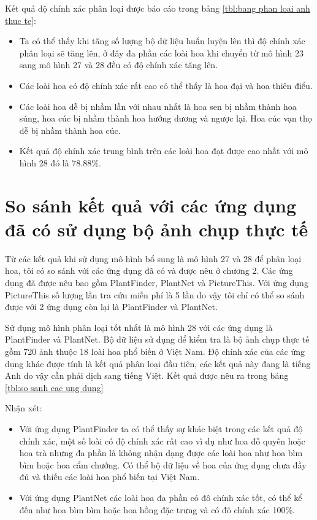 \documentclass[12pt]{report}
\begin{document}
		Kết quả độ chính xác phân loại được báo cáo trong bảng \ref{tbl:bang phan loai anh thuc te}: 		
		\begin{itemize}
			\item Ta có thể thấy khi tăng số lượng bộ dữ liệu huấn luyện lên thì
			độ chính xác phân loại sẽ tăng lên, ở đây đa phần các loài hoa khi chuyển từ mô hình 23 sang mô hình 27 và 28 đều có độ 
			chính xác tăng lên.
			\item Các loài hoa có độ chính xác rất cao có thể thấy là hoa đại và hoa thiên điểu.
			\item Các loài hoa dễ bị nhầm lần với nhau nhất là hoa sen bị nhầm thành hoa súng, hoa cúc bị nhầm thành hoa hướng dương và ngược lại. Hoa cúc vạn thọ dễ bị nhầm thành hoa cúc.
			\item Kết quả độ chính xác trung bình trên các loài hoa đạt được cao nhất với mô hình 28 đó là 78.88\%.
		\end{itemize}\newpage


		\section{So sánh kết quả với các ứng dụng đã có sử dụng bộ ảnh chụp thực tế}
		Từ các kết quả khi sử dụng mô hình bổ sung là mô hình 27 và 28 để phân loại hoa, tôi có so sánh với các ứng dụng đã có và được nêu ở chương 2. 
		Các ứng dụng đã được nêu bao gồm PlantFinder, PlantNet và PictureThis. Với ứng dụng PictureThis số lượng lần tra cứu miễn phí là 5 lần
		do vậy tôi chỉ có thể so sánh được với 2 ứng dụng còn lại là PlantFinder và PlantNet.

		Sử dụng mô hình phân loại tốt nhất là mô hình 28 với các ứng dụng là PlantFinder và PlantNet. Bộ dữ liệu sử dụng để kiểm tra là bộ ảnh chụp thực tế gồm 720 ảnh thuộc 18 loài hoa
		phổ biến ở Việt Nam. Độ chính xác của các ứng dụng khác được tính là kết quả phân loại đầu tiên, các kết quả này đang là tiếng Anh do vậy cần phải dịch sang tiếng Việt.
		Kết quả được nêu ra trong bảng \ref{tbl:so sanh cac ung dung}

		Nhận xét: 		
		\begin{itemize}
			\item Với ứng dụng PlantFinder ta có thể thấy sự khác biệt trong các kết quả độ chính xác, một số loài có độ chính xác rất cao vì dụ như hoa đỗ quyên hoặc hoa trà nhưng đa phần là không nhận dạng được các loài hoa như hoa bìm bìm hoặc hoa cẩm chướng. Có thể bộ dữ liệu về hoa của ứng dụng chưa đầy đủ và thiếu các loài hoa phổ biến tại Việt Nam.
			\item Với ứng dụng PlantNet các loài hoa đa phần có đô chính xác tốt, có thể kể đến như hoa bìm bìm hoặc hoa hồng đặc trưng và có đô chính xác 100\%.
		\end{itemize}
\end{document}
